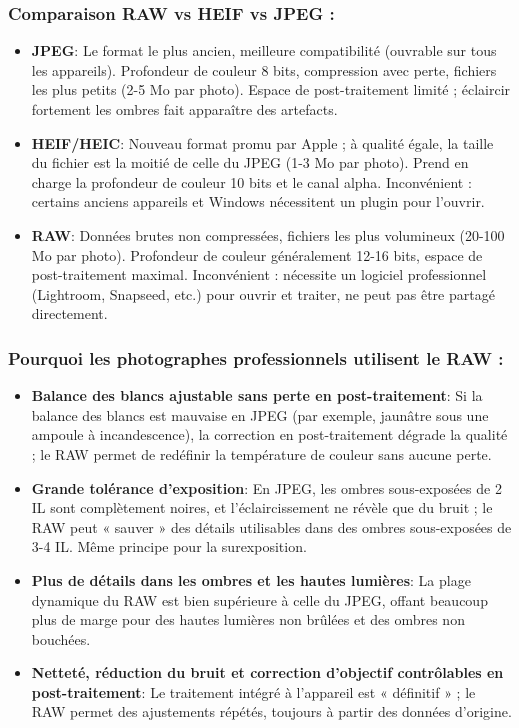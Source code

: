 \subsubsection*{Comparaison RAW vs HEIF vs JPEG :}

\begin{itemize}
  \item \textbf{JPEG}: Le format le plus ancien, meilleure compatibilité (ouvrable sur tous les appareils). Profondeur de couleur 8 bits, compression avec perte, fichiers les plus petits (2-5 Mo par photo). Espace de post-traitement limité ; éclaircir fortement les ombres fait apparaître des artefacts.
  \item \textbf{HEIF/HEIC}: Nouveau format promu par Apple ; à qualité égale, la taille du fichier est la moitié de celle du JPEG (1-3 Mo par photo). Prend en charge la profondeur de couleur 10 bits et le canal alpha. Inconvénient : certains anciens appareils et Windows nécessitent un plugin pour l'ouvrir.
  \item \textbf{RAW}: Données brutes non compressées, fichiers les plus volumineux (20-100 Mo par photo). Profondeur de couleur généralement 12-16 bits, espace de post-traitement maximal. Inconvénient : nécessite un logiciel professionnel (Lightroom, Snapseed, etc.) pour ouvrir et traiter, ne peut pas être partagé directement.
\end{itemize}

\subsubsection*{Pourquoi les photographes professionnels utilisent le RAW :}

\begin{itemize}
  \item \textbf{Balance des blancs ajustable sans perte en post-traitement}: Si la balance des blancs est mauvaise en JPEG (par exemple, jaunâtre sous une ampoule à incandescence), la correction en post-traitement dégrade la qualité ; le RAW permet de redéfinir la température de couleur sans aucune perte.
  \item \textbf{Grande tolérance d'exposition}: En JPEG, les ombres sous-exposées de 2 IL sont complètement noires, et l'éclaircissement ne révèle que du bruit ; le RAW peut « sauver » des détails utilisables dans des ombres sous-exposées de 3-4 IL. Même principe pour la surexposition.
  \item \textbf{Plus de détails dans les ombres et les hautes lumières}: La plage dynamique du RAW est bien supérieure à celle du JPEG, offant beaucoup plus de marge pour des hautes lumières non brûlées et des ombres non bouchées.
  \item \textbf{Netteté, réduction du bruit et correction d'objectif contrôlables en post-traitement}: Le traitement intégré à l'appareil est « définitif » ; le RAW permet des ajustements répétés, toujours à partir des données d'origine.
\end{itemize}

